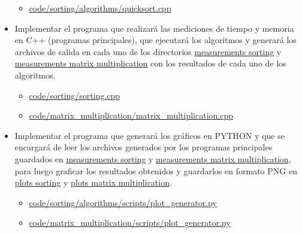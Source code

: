 \begin{itemize}
\begin{itemize}
        \item \href{https://github.com/pabloealvarez/INF221-2025-1-TAREA-1/blob/master/code/sorting/algorithms/quicksort.cpp}{code/sorting/algorithms/quicksort.cpp}
    \end{itemize}
    \item Implementar el programa que realizará las mediciones de tiempo y memoria en C++ (programas principales), que ejecutará los algoritmos y generará los archivos de salida en cada uno de los directorios \href{https://github.com/pabloealvarez/INF221-2025-1-TAREA-1/blob/master/code/sorting/data/measurements/}{measurements sorting} y \href{https://github.com/pabloealvarez/INF221-2025-1-TAREA-1/blob/master/code/sortmatrix+multiplication/data/measurements/}{measurements matrix multiplication} con los resultados de cada uno de los algoritmos.
    \begin{itemize}
        \item \href{https://github.com/pabloealvarez/INF221-2025-1-TAREA-1/blob/master/code/sorting/sorting.cpp}{code/sorting/sorting.cpp}
        \item \href{https://github.com/pabloealvarez/INF221-2025-1-TAREA-1/blob/master/code/matrix_multiplication/matrix_multiplication.cpp}{code/matrix\_multiplication/matrix\_multiplication.cpp}
    \end{itemize}
    \item Implementar el programa que generará los gráficos en PYTHON y que se encargará de leer los archivos generados por los programas principales guardados en  \href{https://github.com/pabloealvarez/INF221-2025-1-TAREA-1/blob/master/code/sorting/data/measurements/}{measurements sorting} y \href{https://github.com/pabloealvarez/INF221-2025-1-TAREA-1/blob/master/code/sortmatrix+multiplication/data/measurements/}{measurements matrix multiplication}, para luego graficar los resultados obtenidos y guardarlos en formato PNG en  \href{https://github.com/pabloealvarez/INF221-2025-1-TAREA-1/blob/master/code/sorting/data/plots/}{plots sorting} y \href{https://github.com/pabloealvarez/INF221-2025-1-TAREA-1/blob/master/code/sortmatrix+multiplication/data/plots/}{plots matrix multiplication}.
    \begin{itemize}
        \item \href{https://github.com/pabloealvarez/INF221-2025-1-TAREA-1/blob/master/code/sorting/scripts/array_generator.py}{code/sorting/algorithms/scripts/plot\_generator.py}
        \item \href{https://github.com/pabloealvarez/INF221-2025-1-TAREA-1/blob/master/code/matrix_multiplication/scripts/matrix_generator.py}{code/matrix\_multiplication/scripts/plot\_generator.py}
    \end{itemize}
\end{itemize}


